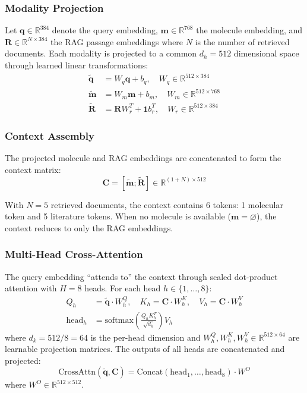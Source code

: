 \documentclass[conference]{IEEEtran}
\begin{document}
\subsubsection{Modality Projection}
Let $\mathbf{q} \in \mathbb{R}^{384}$ denote the query embedding, $\mathbf{m} \in \mathbb{R}^{768}$ the molecule embedding, and $\mathbf{R} \in \mathbb{R}^{N \times 384}$ the RAG passage embeddings where $N$ is the number of retrieved documents. Each modality is projected to a common $d_h = 512$ dimensional space through learned linear transformations:
\begin{align}
    \tilde{\mathbf{q}} &= W_q \mathbf{q} + b_q, \quad W_q \in \mathbb{R}^{512 \times 384} \label{eq:proj_q} \\
    \tilde{\mathbf{m}} &= W_m \mathbf{m} + b_m, \quad W_m \in \mathbb{R}^{512 \times 768} \label{eq:proj_m} \\
    \tilde{\mathbf{R}} &= \mathbf{R} W_r^T + \mathbf{1} b_r^T, \quad W_r \in \mathbb{R}^{512 \times 384} \label{eq:proj_r}
\end{align}

\subsubsection{Context Assembly}
The projected molecule and RAG embeddings are concatenated to form the context matrix:
\begin{equation}
    \mathbf{C} = [\tilde{\mathbf{m}}; \tilde{\mathbf{R}}] \in \mathbb{R}^{(1+N) \times 512}
\end{equation}

With $N = 5$ retrieved documents, the context contains 6 tokens: 1 molecular token and 5 literature tokens. When no molecule is available ($\mathbf{m} = \varnothing$), the context reduces to only the RAG embeddings.

\subsubsection{Multi-Head Cross-Attention}
The query embedding ``attends to'' the context through scaled dot-product attention with $H = 8$ heads. For each head $h \in \{1, \ldots, 8\}$:
\begin{align}
    Q_h &= \tilde{\mathbf{q}} \cdot W_h^Q, \quad K_h = \mathbf{C} \cdot W_h^K, \quad V_h = \mathbf{C} \cdot W_h^V \\
    \text{head}_h &= \text{softmax}\!\left(\frac{Q_h K_h^T}{\sqrt{d_k}}\right) V_h
\end{align}
where $d_k = 512 / 8 = 64$ is the per-head dimension and $W_h^Q, W_h^K, W_h^V \in \mathbb{R}^{512 \times 64}$ are learnable projection matrices. The outputs of all heads are concatenated and projected:
\begin{equation}
    \text{CrossAttn}(\tilde{\mathbf{q}}, \mathbf{C}) = \text{Concat}(\text{head}_1, \ldots, \text{head}_8) \cdot W^O
\end{equation}
where $W^O \in \mathbb{R}^{512 \times 512}$.
\end{document}
